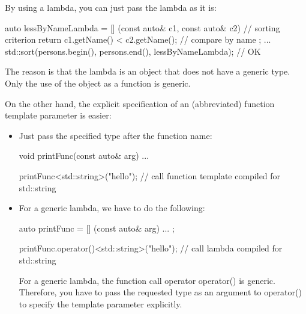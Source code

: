 By using a lambda, you can just pass the lambda as it is:

\begin{cpp}
auto lessByNameLambda = [] (const auto& c1, const auto& c2) { // sorting criterion
							return c1.getName() < c2.getName(); // compare by name
						};
...
std::sort(persons.begin(), persons.end(),
		  lessByNameLambda); // OK
\end{cpp}

The reason is that the lambda is an object that does not have a generic type. Only the use of the object as a function is generic.

On the other hand, the explicit specification of an (abbreviated) function template parameter is easier:

\begin{itemize}
\item
Just pass the specified type after the function name:

\begin{cpp}
void printFunc(const auto& arg) {
	...
}

printFunc<std::string>("hello"); // call function template compiled for std::string
\end{cpp}

\item
For a generic lambda, we have to do the following:

\begin{cpp}
auto printFunc = [] (const auto& arg) {
	...
};

printFunc.operator()<std::string>("hello"); // call lambda compiled for std::string
\end{cpp}

For a generic lambda, the function call operator operator() is generic. Therefore, you have to pass the requested type as an argument to operator() to specify the template parameter explicitly.
\end{itemize}






